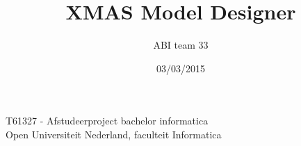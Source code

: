 \documentclass[a4paper,11pt,final]{article}
\author{ABI team 33}
\date{03/03/2015}
\title{\color{blue}XMAS Model Designer}
\begin{document}

\nowidow%

\newcommand{\xmas}{x\textsc{mas}}%
\newcommand{\ok}{$\checkmark$}
\newcommand{\w}[1]{\textbf{\textsc{#1}}}
\newcommand\bw[1]{{\color{blue}#1}}

\newcommand{\mybox}[1]{\begin{boxedminipage}[t]{\textwidth}#1\end{boxedminipage}}



\newcommand\smp[1]{%
	\marginpar{\color{blue}\small\bf\textsc#1}
}%
\newcommand\smpp[1]{\smp{#1}#1}


\maketitle
\begin{center}
	T61327 - Afstudeerproject bachelor informatica
	\\ \hfill\break
	Open Universiteit Nederland, faculteit Informatica
	\\ \hfill\break
\end{center}
\end{document}

